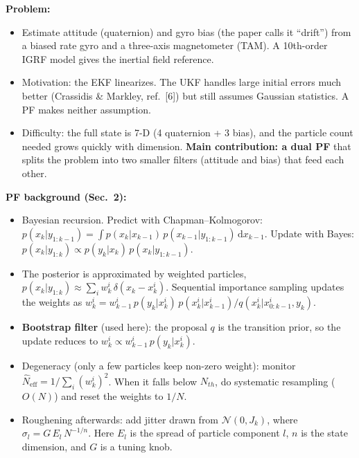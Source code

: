 \documentclass[11pt]{article}
\begin{document}
\textbf{Problem:}
\begin{itemize}[noitemsep]
    \item Estimate attitude (quaternion) and gyro bias (the paper calls it ``drift'') from a biased rate gyro and a three-axis magnetometer (TAM). A 10th-order IGRF model gives the inertial field reference.
    \item Motivation: the EKF linearizes. The UKF handles large initial errors much better (Crassidis \& Markley, ref.\ [6]) but still assumes Gaussian statistics. A PF makes neither assumption.
    \item Difficulty: the full state is 7-D (4 quaternion + 3 bias), and the particle count needed grows quickly with dimension. \textbf{Main contribution: a dual PF} that splits the problem into two smaller filters (attitude and bias) that feed each other.
\end{itemize}

\textbf{PF background (Sec.\ 2):}
\begin{itemize}[noitemsep]
    \item Bayesian recursion. Predict with Chapman--Kolmogorov: $p(x_k|y_{1:k-1}) = \int p(x_k|x_{k-1})\,p(x_{k-1}|y_{1:k-1})\,\mathrm{d}x_{k-1}$. Update with Bayes: $p(x_k|y_{1:k}) \propto p(y_k|x_k)\,p(x_k|y_{1:k-1})$.
    \item The posterior is approximated by weighted particles, $p(x_k|y_{1:k}) \approx \sum_i w_k^i\,\delta(x_k - x_k^i)$. Sequential importance sampling updates the weights as $w_k^i = w_{k-1}^i\, p(y_k|x_k^i)\,p(x_k^i|x_{k-1}^i)/q(x_k^i|x_{0:k-1}^i, y_k)$.
    \item \textbf{Bootstrap filter} (used here): the proposal $q$ is the transition prior, so the update reduces to $w_k^i \propto w_{k-1}^i\, p(y_k|x_k^i)$.
    \item Degeneracy (only a few particles keep non-zero weight): monitor $\hat{N}_{\mathrm{eff}} = 1/\sum_i (w_k^i)^2$. When it falls below $N_{th}$, do systematic resampling ($O(N)$) and reset the weights to $1/N$.
    \item Roughening afterwards: add jitter drawn from $\mathcal{N}(0, J_k)$, where $\sigma_l = G\,E_l\,N^{-1/n}$. Here $E_l$ is the spread of particle component $l$, $n$ is the state dimension, and $G$ is a tuning knob.
\end{itemize}
\end{document}
